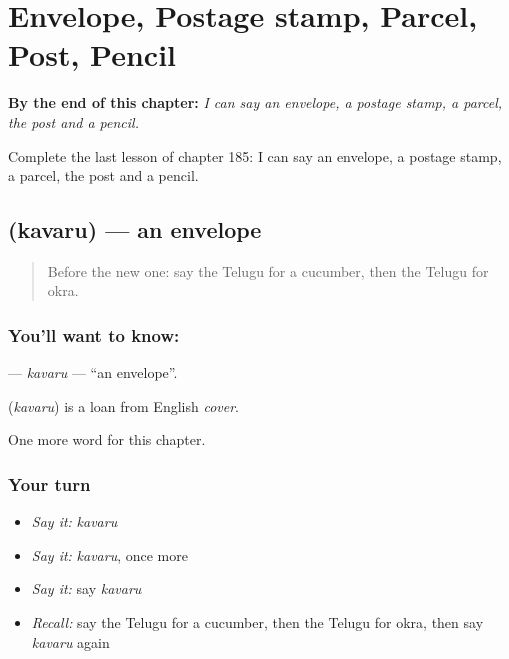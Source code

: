 
\chapter{Envelope, Postage stamp, Parcel, Post, Pencil}
\label{ch:te-envelope-postage-stamp-parcel-post-pencil}

\begin{chapteropening}
\textbf{By the end of this chapter:} \emph{I can say an envelope, a postage stamp, a parcel, the post and a pencil.}

Complete the last lesson of chapter 185: I can say an envelope, a postage stamp, a parcel, the post and a pencil.
\end{chapteropening}

\section[\texorpdfstring{\te{కవరు} (kavaru)}{కవరు (kavaru)}]{ (kavaru) — an envelope}

\label{lesson:TE-C185-kavaru}



\begin{quote}
Before the new one: say the Telugu for a cucumber, then the Telugu for okra.
\end{quote}

\subsection*{You'll want to know: }
\textbf{} — \emph{kavaru} — \textquotedblleft{}an envelope\textquotedblright{}.

\begin{cousinweb}
\textbf{} (\emph{kavaru}) is a loan from English \emph{cover}.
\end{cousinweb}

\begin{grammarlens}[title={What you've built}]
One more word for this chapter.
\end{grammarlens}

\subsection*{Your turn}
\begin{itemize}
\raggedright
  \item \emph{Say it:} \emph{kavaru}
  \item \emph{Say it:} \emph{kavaru}, once more
  \item \emph{Say it:} say \emph{kavaru}
  \item \emph{Recall:} say the Telugu for a cucumber, then the Telugu for okra, then say \emph{kavaru} again
\end{itemize}

